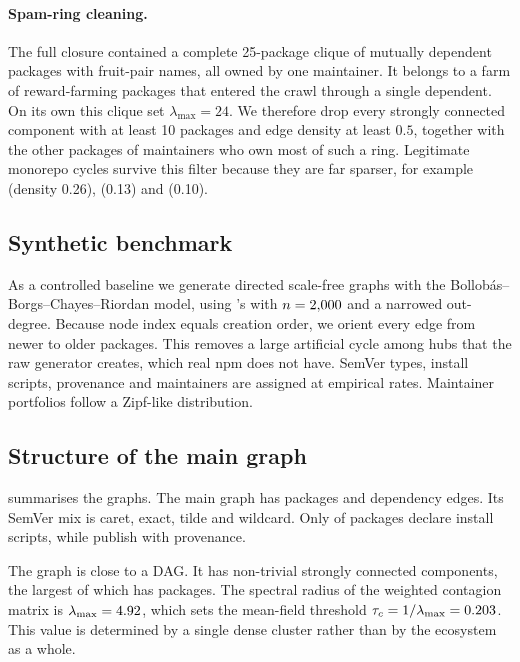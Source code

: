 \paragraph{Spam-ring cleaning.}
The full closure contained a complete 25-package clique of mutually dependent packages with
fruit-pair names, all owned by one maintainer. It belongs to a farm of \SpamRemoved{} reward-farming
packages that entered the crawl through a single dependent. On its own this clique set
$\lambda_{\max}=24$. We therefore drop every strongly connected component with at least 10 packages and
edge density at least $0.5$, together with the other packages of maintainers who own most of such a
ring. Legitimate monorepo cycles survive this filter because they are far sparser, for example
 (density 0.26),  (0.13) and  (0.10).

\subsection{Synthetic benchmark}
As a controlled baseline we generate directed scale-free graphs with the Bollob\'as--Borgs--Chayes--Riordan
model, using 's  with $n=2{,}000$ and a narrowed out-degree. Because
node index equals creation order, we orient every edge from newer to older packages. This removes a
large artificial cycle among hubs that the raw generator creates, which real npm does not have. SemVer
types, install scripts, provenance and maintainers are assigned at empirical rates. Maintainer
portfolios follow a Zipf-like distribution.

\subsection{Structure of the main graph}
 summarises the graphs. The main graph has \MainN{} packages and \MainE{} dependency
edges. Its SemVer mix is \MainSemverCaret{} caret, \MainSemverExact{} exact, \MainSemverTilde{} tilde and
\MainSemverWildcard{} wildcard. Only \MainHooks{} of packages declare install scripts, while
\MainProvenance{} publish with provenance.

The graph is close to a DAG. It has \MainNontrivialSCC{} non-trivial strongly connected components, the
largest of which has \MainLargestSCC{} packages. The spectral radius of the weighted contagion matrix is
$\lambda_{\max}=4.92$, which sets the mean-field threshold $\tau_c=1/\lambda_{\max}=0.203$.
This value is determined by a single dense  cluster rather than by the ecosystem as a
whole.


